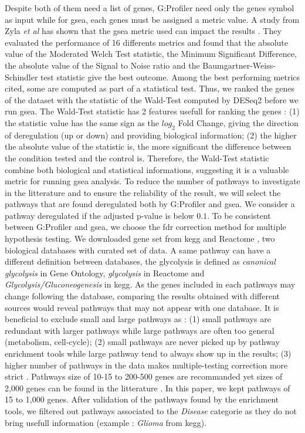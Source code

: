Despite both of them need a list of genes, G:Profiler need only the genes symbol as input while for \acrshort{gsea}, each genes must be assigned a metric value.
A study from Zyla \textit{et al} has shown that the \acrshort{gsea} metric used can impact the results \cite*{Zyla2017}.
They evaluated the performance of 16 differents metrics and found that the absolute value of the Moderated Welch Test statistic, the Minimum Significant Difference, the absolute value of the Signal to Noise ratio and the Baumgartner-Weiss-Schindler test statistic give the best outcome.
Among the best performing metrics cited, some are computed as part of a statistical test.
Thus, we ranked the genes of the dataset with the statistic of the Wald-Test computed by DESeq2 before we run \acrshort{gsea}.
The Wald-Test statistic has 2 features usefull for ranking the genes : (1) the statistic value has the same sign as the $log_2$ Fold Change, giving the direction of deregulation (up or down) and providing biological information; (2) the higher the absolute value of the statistic is, the more significant the difference between the condition tested and the control is.
Therefore, the Wald-Test statistic combine both biological and statistical informations, suggesting it is a valuable metric for running \acrshort{gsea} analysis.
To reduce the number of pathways to investigate in the litterature and to ensure the reliability of the result, we will select the pathways that are found deregulated both by G:Profiler and \acrshort{gsea}.
We consider a pathway deregulated if the adjusted p-value is below $0.1$.
To be consistent between G:Profiler and \acrshort{gsea}, we choose the \acrfull{fdr} correction method for multiple hypothesis testing.
We downloaded gene set from \acrshort{kegg} \cite*{Kanehisa2019} and Reactome \cite*{Gillespie2022}, two biological databases with curated set of data.
A same pathway can have a different definition between databases, the glycolysis is defined as \textit{canonical glycolysis} in Gene Ontology, \textit{glycolysis} in Reactome and \textit{Glycolysis/Gluconeogenesis} in \acrshort{kegg}.
As the genes included in each pathways may change following the database, comparing the results obtained with different sources would reveal pathways that may not appear with one database.
It is beneficial to exclude small and large pathways as : (1) small pathways are redundant with larger pathways while large pathways are often too general (metabolism, cell-cycle); (2) small pathways are never picked up by pathway enrichment tools while large pathway tend to always show up in the results; (3) higher number of pathways in the data makes multiple-testing correction more strict \cite*{Reimand2019}.
Pathways size of 10-15 to 200-500 genes are recommanded yet sizes of 2,000 genes can be found in the litterature \cite*{Reimand2019}.
In this paper, we kept pathways of 15 to 1,000 genes.
After validation of the pathways found by the enrichment tools, we filtered out pathways associated to the \textit{Disease} categorie as they do not bring usefull information (example : \textit{Glioma} from \acrshort{kegg}).
